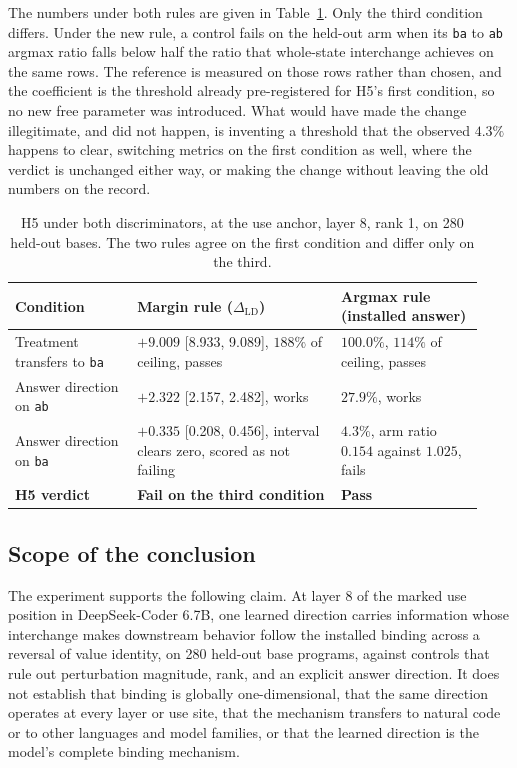 \documentclass{article}
\begin{document}
The numbers under both rules are given in Table~\ref{tab:app-h5}. Only the third condition differs. Under the new rule, a control fails on the held-out arm when its \texttt{ba} to \texttt{ab} argmax ratio falls below half the ratio that whole-state interchange achieves on the same rows. The reference is measured on those rows rather than chosen, and the coefficient is the threshold already pre-registered for H5's first condition, so no new free parameter was introduced. What would have made the change illegitimate, and did not happen, is inventing a threshold that the observed $4.3\%$ happens to clear, switching metrics on the first condition as well, where the verdict is unchanged either way, or making the change without leaving the old numbers on the record.

\begin{table}[htbp]
\centering
\small
\caption{H5 under both discriminators, at the use anchor, layer 8, rank 1, on 280 held-out bases. The two rules agree on the first condition and differ only on the third.}
\label{tab:app-h5}
\begin{tabular}{@{}p{0.24\linewidth}p{0.40\linewidth}p{0.29\linewidth}@{}}
\toprule
Condition & Margin rule ($\Delta_{\mathrm{LD}}$) & Argmax rule (installed answer) \\
\midrule
Treatment transfers to \texttt{ba} & $+9.009$ [8.933, 9.089], $188\%$ of ceiling, passes & $100.0\%$, $114\%$ of ceiling, passes \\[2pt]
Answer direction on \texttt{ab}    & $+2.322$ [2.157, 2.482], works & $27.9\%$, works \\[2pt]
Answer direction on \texttt{ba}    & $+0.335$ [0.208, 0.456], interval clears zero, scored as not failing & $4.3\%$, arm ratio $0.154$ against $1.025$, fails \\
\midrule
\textbf{H5 verdict} & \textbf{Fail on the third condition} & \textbf{Pass} \\
\bottomrule
\end{tabular}
\end{table}

\subsection{Scope of the conclusion}

The experiment supports the following claim. At layer 8 of the marked use position in DeepSeek-Coder 6.7B, one learned direction carries information whose interchange makes downstream behavior follow the installed binding across a reversal of value identity, on 280 held-out base programs, against controls that rule out perturbation magnitude, rank, and an explicit answer direction. It does not establish that binding is globally one-dimensional, that the same direction operates at every layer or use site, that the mechanism transfers to natural code or to other languages and model families, or that the learned direction is the model's complete binding mechanism.
\end{document}
